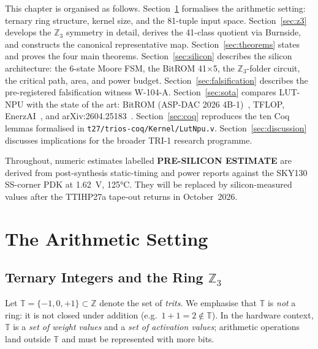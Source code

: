 \medskip

This chapter is organised as follows.
Section~\ref{sec:arithmetic} formalises the arithmetic setting:
ternary ring structure, kernel size, and the 81-tuple input space.
Section~\ref{sec:z3} develops the \(\mathbb{Z}_3\) symmetry in detail,
derives the 41-class quotient via Burnside, and constructs the canonical
representative map.
Section~\ref{sec:theorems} states and proves the four main theorems.
Section~\ref{sec:silicon} describes the silicon architecture: the 6-state
Moore FSM, the BitROM 41$\times$5, the \(\mathbb{Z}_3\)-folder circuit,
the critical path, area, and power budget.
Section~\ref{sec:falsification} describes the pre-registered falsification
witness W-104-A.
Section~\ref{sec:sota} compares LUT-NPU with the state of the art:
BitROM (ASP-DAC 2026 4B-1)~\cite{aspdac2026}, TFLOP, EnerzAI~\cite{enerzai},
and arXiv:2604.25183~\cite{arxiv2604}.
Section~\ref{sec:coq} reproduces the ten Coq lemmas formalised in
\texttt{t27/trios-coq/Kernel/LutNpu.v}.
Section~\ref{sec:discussion} discusses implications for the broader
TRI-1 research programme.

Throughout, numeric estimates labelled \textbf{PRE-SILICON ESTIMATE} are
derived from post-synthesis static-timing and power reports against the
SKY130 SS-corner PDK at 1.62~V, 125°C.  They will be replaced by
silicon-measured values after the TTIHP27a tape-out returns in
October~2026.

\section{The Arithmetic Setting}
\label{sec:arithmetic}

\subsection{Ternary Integers and the Ring \texorpdfstring{$\mathbb{Z}_3$}{Z3}}
\label{subsec:ternary_ring}

Let \(\mathbb{T} = \{-1, 0, +1\} \subset \mathbb{Z}\) denote the set of
\emph{trits}.  We emphasise that \(\mathbb{T}\) is \emph{not} a ring: it
is not closed under addition (e.g.\ \(1 + 1 = 2 \notin \mathbb{T}\)).
In the hardware context, \(\mathbb{T}\) is a \emph{set of weight values}
and a \emph{set of activation values}; arithmetic operations land outside
\(\mathbb{T}\) and must be represented with more bits.

